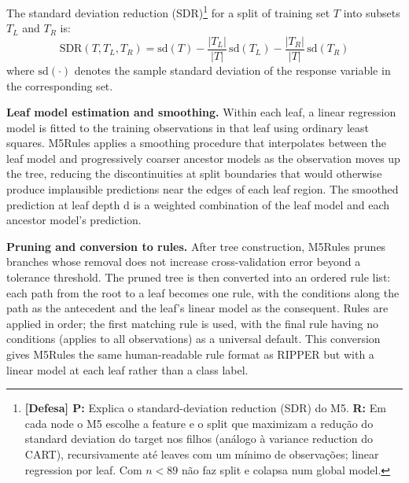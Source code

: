 The standard deviation reduction (SDR)\footnote{\textbf{[Defesa] P:} Explica o standard-deviation reduction (SDR) do M5. \textbf{R:} Em cada node o M5 escolhe a feature e o split que maximizam a redução do standard deviation do target nos filhos (análogo à variance reduction do CART), recursivamente até leaves com um mínimo de observações; linear regression por leaf. Com $n<89$ não faz split e colapsa num global model.} for a split of training set $T$ into subsets $T_L$ and $T_R$ is:
\begin{equation}
  \text{SDR}(T, T_L, T_R) = \text{sd}(T) - \frac{|T_L|}{|T|}\,\text{sd}(T_L) - \frac{|T_R|}{|T|}\,\text{sd}(T_R)
  \label{eq:sdr}
\end{equation}
where $\text{sd}(\cdot)$ denotes the sample standard deviation of the response variable in the corresponding set.

\textbf{Leaf model estimation and smoothing. }Within each leaf, a linear regression model is fitted to the training observations in that leaf using ordinary least squares. M5Rules applies a smoothing procedure that interpolates between the leaf model and progressively coarser ancestor models as the observation moves up the tree, reducing the discontinuities at split boundaries that would otherwise produce implausible predictions near the edges of each leaf region. The smoothed prediction at leaf depth d is a weighted combination of the leaf model and each ancestor model's prediction.

\textbf{Pruning and conversion to rules. }After tree construction, M5Rules prunes branches whose removal does not increase cross-validation error beyond a tolerance threshold. The pruned tree is then converted into an ordered rule list: each path from the root to a leaf becomes one rule, with the conditions along the path as the antecedent and the leaf's linear model as the consequent. Rules are applied in order; the first matching rule is used, with the final rule having no conditions (applies to all observations) as a universal default. This conversion gives M5Rules the same human-readable rule format as RIPPER but with a linear model at each leaf rather than a class label.

